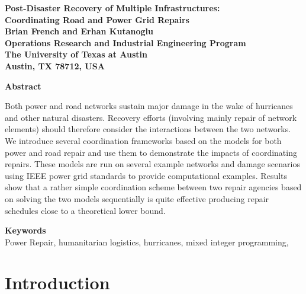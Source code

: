 \documentclass[10pt]{article}
\begin{document}
\newpage
\thispagestyle{empty}
\begin{center}
{\Large \textbf{Post-Disaster Recovery of Multiple Infrastructures: \\ Coordinating Road and Power Grid Repairs}} \\
\vspace*{0.2cm}
{\large \textbf{Brian French and Erhan Kutanoglu}} \\
{\large \textbf{Operations Research and Industrial Engineering Program}} \\
{\large \textbf{The University of Texas at Austin}} \\
{\large \textbf{Austin, TX 78712, USA}} \\
\end{center}

\thispagestyle{empty}
\begin{center}
{\large \bf Abstract}
\end{center}
Both power and road networks sustain major damage in the wake of hurricanes and other natural disasters. Recovery efforts (involving mainly repair of network elements)  should therefore consider the interactions between the two networks. We introduce several coordination frameworks based on the models for both power and road repair and use them to demonstrate the impacts of coordinating repairs. These models are run on several example networks and damage scenarios using IEEE power grid standards to provide computational examples. Results show that a rather simple coordination scheme between two repair agencies based on solving the two models sequentially is quite effective producing repair schedules close to a theoretical lower bound.


{\large \bf Keywords}\\
\vspace*{-12pt}
Power Repair, humanitarian logistics, hurricanes, mixed integer programming, 
\vspace*{-12pt}
\section{{\large Introduction}}
\label{sec:ic:intro}
\vspace*{-12pt}
\end{document}
